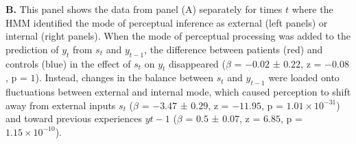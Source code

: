 \documentclass[
]{article}
\begin{document}
\textbf{B.} This panel shows the data from panel (A) separately for
times \(t\) where the HMM identified the mode of perceptual inference as
external (left panels) or internal (right panels). When the mode of
perceptual processing was added to the prediction of \(y_t\) from
\(s_t\) and \(y_{t-1}\), the difference between patients (red) and
controls (blue) in the effect of \(s_t\) on \(y_t\) disappeared
(\(\beta\) = \(-0.02\) ± \(0.22\), z = \(-0.08\), p = \(1\)). Instead,
changes in the balance between \(s_t\) and \(y_{t-1}\) were loaded onto
fluctuations between external and internal mode, which caused perception
to shift away from external inputs \(s_t\) (\(\beta\) = \(-3.47\) ±
\(0.29\), z = \(-11.95\), p = \(\ensuremath{1.01\times 10^{-31}}\)) and
toward previous experiences \(y{t-1}\) (\(\beta\) = \(0.5\) ± \(0.07\),
z = \(6.85\), p = \(\ensuremath{1.15\times 10^{-10}}\)).
\end{document}
